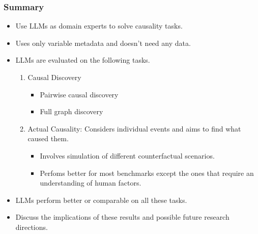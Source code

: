 \documentclass{beamer}
\begin{document}
\begin{frame}
	\frametitle{Summary}
	\begin{itemize}
		\item Use LLMs as domain experts to solve causality tasks.
		\item Uses only variable metadata and doesn't need any data.
		\item LLMs are evaluated on the following tasks.
		\begin{enumerate}
			\item Causal Discovery
				\begin{itemize}
					\item Pairwise causal discovery
					\item Full graph discovery
				\end{itemize}
			\item Actual Causality: Considers individual events and aims to
				find what caused them.
				\begin{itemize}
					\item Involves simulation of different counterfactual scenarios.
					\item Perfoms better for most benchmarks except
						the ones that require an understanding
						of human factors.
				\end{itemize}
		\end{enumerate}
		\item LLMs perform better or comparable on all these tasks. 
		\item Discuss the implications of these results and possible
			future research directions.
	\end{itemize}
\end{frame}
\end{document}
